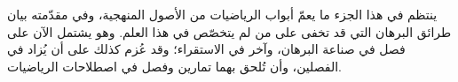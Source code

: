 \documentclass[../../include/open-logic-part]{subfiles}
\begin{document}

\begin{editorial}
  ينتظم في هذا الجزء ما يعمّ أبواب الرياضيات من الأصول المنهجية، وفي
  مقدّمته بيان طرائق البرهان التي قد تخفى على من لم يتخصّص في هذا
  العلم. وهو يشتمل الآن على فصل في صناعة البرهان، وآخر في الاستقراء؛
  وقد عُزم كذلك على أن يُزاد في الفصلين، وأن تُلحق بهما تمارين وفصل في
  اصطلاحات الرياضيات.
\end{editorial}



\OLEndPartHook
\end{document}
